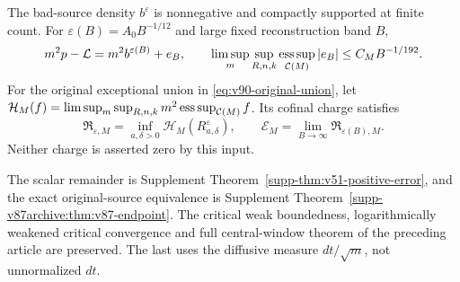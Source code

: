 \begin{inputstatement}
\label{input:v90-scalar}
The bad-source density $b^\varepsilon$ is nonnegative and compactly
supported at finite count. For $\varepsilon(B)=A_0B^{-1/12}$ and
large fixed reconstruction band $B$,
\begin{equation}\label{eq:v76-remainder}
 m^2p-\mathcal L=m^2b^{\varepsilon(B)}+e_B,\qquad
 \limsup_m\sup_{R,n,k}\esssup_{\mathcal C(M)}|e_B|
                                  \le C_MB^{-1/192}.
\end{equation}
For the original exceptional union in \eqref{eq:v90-original-union},
let $\mathcal H_M(f)=\limsup_m\sup_{R,n,k}m^2\operatorname*{ess\,sup}_{\mathcal C(M)}f$.
Its cofinal charge satisfies
\[
 \mathfrak R_{\varepsilon,M}
   =\inf_{a,\delta>0}\mathcal H_M(R_{a,\delta}^\varepsilon),\qquad
 \mathcal E_M=\lim_{B\to\infty}\mathfrak R_{\varepsilon(B),M}.
\]
Neither charge is asserted zero by this input.
\end{inputstatement}
The scalar remainder is Supplement Theorem~\ref{supp-thm:v51-positive-error},
and the exact original-source equivalence is Supplement
Theorem~\ref{supp-v87archive:thm:v87-endpoint}. The critical weak
boundedness, logarithmically weakened critical convergence and full
central-window theorem of the preceding article are preserved. The last
uses the diffusive measure $dt/\sqrt m$, not unnormalized $dt$.
